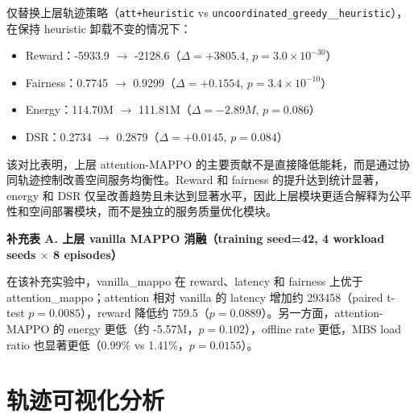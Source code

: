 仅替换上层轨迹策略（\texttt{att+heuristic} vs \texttt{uncoordinated\_greedy\_\_heuristic}），在保持 heuristic 卸载不变的情况下：
\begin{itemize}
    \item Reward：-5933.9 $\rightarrow$ -2128.6（$\Delta=+3805.4$, $p=3.0\times10^{-30}$）
    \item Fairness：0.7745 $\rightarrow$ 0.9299（$\Delta=+0.1554$, $p=3.4\times10^{-10}$）
    \item Energy：114.70M $\rightarrow$ 111.81M（$\Delta=-2.89M$, $p=0.086$）
    \item DSR：0.2734 $\rightarrow$ 0.2879（$\Delta=+0.0145$, $p=0.084$）
\end{itemize}

该对比表明，上层 attention-MAPPO 的主要贡献不是直接降低能耗，而是通过协同轨迹控制改善空间服务均衡性。Reward 和 fairness 的提升达到统计显著，energy 和 DSR 仅呈改善趋势且未达到显著水平，因此上层模块更适合解释为公平性和空间部署模块，而不是独立的服务质量优化模块。

\textbf{补充表 A. 上层 vanilla MAPPO 消融（training seed=42, 4 workload seeds $\times$ 8 episodes）}

\begin{table}[!htbp]
    \centering
    \label{tab:vanilla-ablation}
\end{table}

在该补充实验中，vanilla\_mappo 在 reward、latency 和 fairness 上优于 attention\_mappo；attention 相对 vanilla 的 latency 增加约 293458（paired t-test $p=0.0085$），reward 降低约 759.5（$p=0.0889$）。另一方面，attention-MAPPO 的 energy 更低（约 -5.57M，$p=0.102$），offline rate 更低，MBS load ratio 也显著更低（0.99\% vs 1.41\%，$p=0.0155$）。

\section{轨迹可视化分析}
\label{sec:trajectory-visualization}

